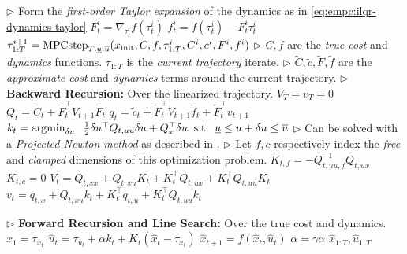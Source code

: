 \begin{algorithm}[H]
\begin{algorithmic}
    \State
    \State \(\triangleright\) Form the \emph{first-order Taylor expansion} of
    the dynamics as in \cref{eq:empc:ilqr-dynamics-taylor}
    \State $F_t^i=\nabla_{\tau_t^i} f(\tau_t^i)$
    \State $f_t^i= f(\tau_t^i) - F_t^i \tau_t^i$
  \EndFor
  \State $\tau_{1:T}^{i+1} = \mathrm{MPCstep}_{T,\underline{u},\overline{u}}(
  x_{\rm init}, C, f, \tau_{1:T}^i, C^i, c^i, F^i, f^i)$
  \EndFor
  \State
  \State \(\triangleright\)
  $C,f$ are the \emph{true cost} and \emph{dynamics} functions.
  $\tau_{1:T}$ is the \emph{current trajectory} iterate.
  \State \(\triangleright\) $\tilde C, \tilde c, \tilde F, \tilde f$ are
  the \emph{approximate cost} and \emph{dynamics} terms around the current trajectory.
  \State
  \State \(\triangleright\) \textbf{Backward Recursion:} Over the linearized trajectory.
  \State $V_T = v_T = 0$
  \State $Q_t = \tilde C_t+\tilde F_t^\top V_{t+1}\tilde F_t$
  \State $q_t = \tilde c_t+\tilde F_t^\top V_{t+1}\tilde f_t + \tilde F_t^\top v_{t+1}$
  \State
  \State $k_t = \operatorname*{argmin}_{\delta u} \;\;
        \frac{1}{2} \delta u^\top  Q_{t,uu}\delta u + Q_x^\top  \delta u
    \;\; \mathrm{s.t.} \;\; \underline{u}\leq u+\delta u \leq \overline{u}$
  \State \(\triangleright\) Can be solved with a \emph{Projected-Newton
  method} as described in \cite{tassa2014control}.
  \State \(\triangleright\) Let $f,c$ respectively index the \emph{free} and
   \emph{clamped} dimensions of this optimization problem.
  \State
  \State $K_{t,f} = -Q_{t,uu,f}^{-1} Q_{t,ux}$
  \State $K_{t,c} = 0$
  \State
  \State $V_t = Q_{t,xx}+Q_{t,xu}K_t+K_t^\top Q_{t,ux}+K_t^\top Q_{t,uu}K_t$
  \State $v_t = q_{t,x}+Q_{t,xu}k_t+K_t^\top q_{t,u}+K_t^\top Q_{t,uu}k_t$
  \EndFor

  \State
  \State \(\triangleright\) \textbf{Forward Recursion and Line Search:}
  Over the true cost and dynamics.
  \Repeat
  \State $\hat x_1 = \tau_{x_1}$
  \State $\hat u_t = \tau_{u_t} + \alpha k_t +  K_t (\hat x_t - \tau_{x_t})$
  \State $\hat x_{t+1} = f(\hat x_t, \hat u_t)$
  \EndFor
  \State $\alpha = \gamma \alpha$
  \State
  \State \Return $\hat x_{1:T}, \hat u_{1:T}$
  \EndFunction
\end{algorithmic}
\end{algorithm}

